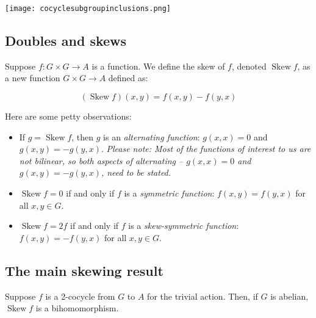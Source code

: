 \documentclass[10pt]{amsart}
\newcommand{\Skew}{\operatorname{Skew}}
\begin{document}
\texttt{[image: cocyclesubgroupinclusions.png]}

\subsection{Doubles and skews}

Suppose $f:G \times G \to A$ is a function. We define the skew of $f$,
denoted $\Skew f$, as a new function $G \times G \to A$ defined as:

$$(\Skew f)(x,y) = f(x,y) - f(y,x)$$

Here are some petty observations:

\begin{itemize}
\item If $g = \Skew f$, then $g$ is an {\em alternating function}:
  $g(x,x) = 0$ and $g(x,y) = -g(y,x)$. {\em Please note: Most of the
  functions of interest to us are not bilinear, so both aspects of
  alternating -- $g(x,x) = 0$ and $g(x,y) = -g(y,x)$, need to be
  stated.}
\item $\Skew f = 0$ if and only if $f$ is a {\em symmetric function}:
  $f(x,y) = f(y,x)$ for all $x,y \in G$.
\item $\Skew f = 2f$ if and only if $f$ is a {\em skew-symmetric
  function}: $f(x,y) = -f(y,x)$ for all $x,y \in G$.
\end{itemize}

\subsection{The main skewing result}

\begin{lemma}
  Suppose $f$ is a 2-cocycle from $G$ to $A$ for the trivial
  action. Then, if $G$ is abelian, $\Skew f$ is a bihomomorphism.
\end{lemma}
\end{document}
